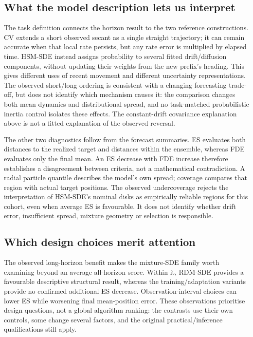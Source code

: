 \subsection{What the model description lets us interpret}
The task definition connects the horizon result to the two reference
constructions. CV extends a short observed secant as a single straight
trajectory; it can remain accurate when that local rate persists, but any
rate error is multiplied by elapsed time. HSM-SDE instead assigns probability
to several fitted drift/diffusion components, without updating their weights
from the new prefix's heading. This gives different uses of recent movement
and different uncertainty representations. The observed short/long ordering
is consistent with a changing forecasting trade-off, but does not identify
which mechanism causes it: the comparison changes both mean dynamics and
distributional spread, and no task-matched probabilistic inertia control
isolates these effects. The constant-drift covariance explanation above is
not a fitted explanation of the observed reversal.

The other two diagnostics follow from the forecast summaries. ES evaluates
both distances to the realized target and distances within the ensemble,
whereas FDE evaluates only the final mean. An ES decrease with FDE increase
therefore establishes a disagreement between criteria, not a mathematical
contradiction. A radial particle quantile describes the model's own spread;
coverage compares that region with actual target positions. The observed
undercoverage rejects the interpretation of HSM-SDE's nominal disks as
empirically reliable regions for this cohort, even when average ES is
favourable. It does not identify whether drift error, insufficient spread,
mixture geometry or selection is responsible.

\subsection{Which design choices merit attention}
The observed long-horizon benefit makes the mixture-SDE family worth
examining beyond an average all-horizon score. Within it, RDM-SDE provides
a favourable descriptive structural result, whereas the training/adaptation
variants provide no confirmed additional ES decrease. Observation-interval
choices can lower ES while worsening final mean-position error.
These observations prioritise design questions, not a global algorithm
ranking: the contrasts use their own controls, some change several factors,
and the original practical/inference qualifications still apply.

